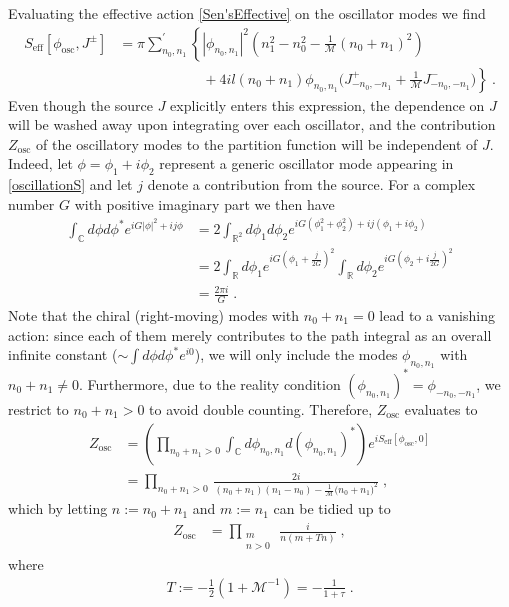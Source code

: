 \documentclass[11pt]{article}
\numberwithin{equation}{section}
\begin{document}
\begin{appendix}
Evaluating the effective action \eqref{Sen'sEffective} on the oscillator modes we find
\begin{align}
S_{\text{eff}}[\phi_{\text{osc}},J^\pm]&=  \pi \sum_{n_0,n_1}^\prime  \left\{ |\phi_{n_0,n_1}|^2 \left( n_1^2-n_0^2 -  \frac{1}{{\mathcal M}}(n_0+n_1)^2\right)  \right.\nonumber\\
&\left.\qquad\qquad\qquad
+4i l(n_0+n_1) \phi_{n_0,n_1}\big( J^+_{-n_0,-n_1} + \frac{1}{{\mathcal M}} J^-_{-n_0,-n_1} \big) \right\}\ .
\label{oscillationS}
\end{align}
Even though the source $J$ explicitly enters this expression, the dependence on $J$ will be washed away upon integrating over each oscillator, and the contribution $Z_{\text{osc}}$ of the oscillatory modes to the partition function will be independent of $J$. Indeed, let $\phi=\phi_1+i\phi_2$ represent a generic oscillator mode appearing in \eqref{oscillationS} and let ${j}$ denote a contribution from the  source. For a complex number $G$ with positive imaginary part we then have
 \begin{align}
 \int_{\mathbb{C}} d\phi d \phi^* e^{i G|\phi|^2+i{j}\phi} & = 2 \int_{\mathbb{R}^2}  d\phi_1d \phi_2 e^{i G(\phi_1^2+\phi_2^2)+i{j}(\phi_1+i\phi_2)}\nonumber\\
  	& =  2\int_{\mathbb{R}}  d \phi_1 e^{i G\left(\phi_1+\frac{ j}{2G}\right)^2}\int_{\mathbb{R}}  d \phi_2 e^{i G\left(\phi_2+i\frac{ j}{2G}\right)^2}\nonumber\\
  	& =\frac{2\pi i}{G}\;.
 \end{align}
 Note that the chiral (right-moving) modes with $n_0+n_1=0$ lead to a vanishing action: since each of them merely contributes to the path integral as an overall infinite constant ($\sim \int d\phi d \phi^* e^{i0}$), we will only include  the modes $\phi_{n_0,n_1}$ with $n_0+n_1\ne 0$. Furthermore, due to the reality condition $(\phi_{n_0,n_1})^* = \phi_{-n_0,-n_1}$, we restrict to $n_0+n_1> 0$ to avoid double counting. Therefore, $Z_{\text{osc}}$ evaluates to 
\begin{align}
Z_{\text{osc}}&= \left( \prod_{n_0+n_1>0 }
\int_{\mathbb{C}}d\phi_{n_0,n_1}d(\phi_{n_0,n_1})^*\right)e^{i S_{\text{eff}}[\phi_{\text{osc}},0]}\nonumber \\
&=\prod_{ n_0+n_1>0} \, {\frac{2i}{  (n_0+n_1) (n_1-n_0) - \frac{1}{{\mathcal M}} \big( n_0 + n_1 )^2 }}\;,
\label{InfProd}
\end{align}
which by letting $n:=n_0+n_1 $ and $m := n_1$ can be tidied up to
\begin{align}
Z_{\text{osc}}&=\prod_{\substack{m\\ n>0}}\, {\frac{i}{  n(m+Tn)}}\;,
\label{zetareg}
\end{align}
where
\begin{align}
\label{Tparameter}
    T :=-\frac12 (1+ {\mathcal M}^{-1})= - \frac{1}{1+ \tau}\;.
\end{align}



\end{appendix}
\end{document}
